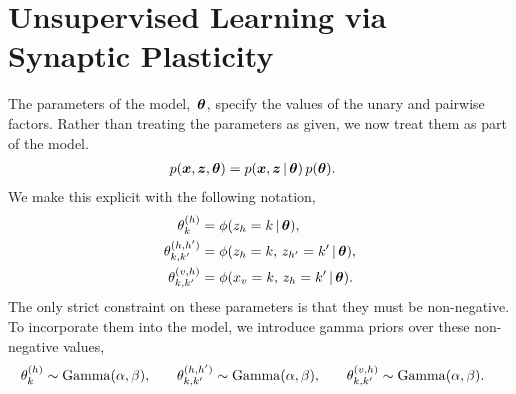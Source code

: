 \begin{comment}
To start, assume~$\gamma=1$,~$\bo=\bone$,
and~${\bG = \bone\bone^\trans}$ (fully connected) so that
${\blambda_{\textsf{ss}} = b \left( \bI - \bA \right)^{-1} \bone}$.
Under these conditions, the model is receiving uninformative
observations, so we expect the posterior probability to be determined
solely by the location dynamics model. How do we reconcile this 
steady state solution with our intuition from Markov chain 
theory that the steady state should converge to the principal 
eigenvector of the transition matrix? If~$\bA$ is a row 
stochastic transition matrix (all rows sum to one), 
then by the Perron-Frobenius theorem the maximum eigenvalue is 
exactly one. Thus,~$\bI - \bA$ will be singular, and its inverse 
will diverge to infinity. However, in Markov chains,~$b=0$, 
so this divergence is canceled out and the limit is 
the principal eigenvector of~$\bA$.

Can we design a system with~$b>0$ and~$\rho(\bA)<1$ that closely 
approximates this steady state distribution? 
\end{comment}

\section{Unsupervised Learning via Synaptic Plasticity}
\label{sec:learning}
The parameters of the model,~$\boldsymbol{\theta}$, specify the values of the 
unary and pairwise factors. Rather than
treating the parameters as given, we now treat them as part of the
model.
\begin{align}
  p(\boldsymbol{x}, \boldsymbol{z}, \boldsymbol{\theta}) &= p(\boldsymbol{x}, \boldsymbol{z} \,|\, \boldsymbol{\theta}) \, p(\boldsymbol{\theta}).
\end{align}
We make this explicit with the following notation,
\begin{align}
  \theta_{k}^{(h)} &= \phi(z_h=k \,|\, \boldsymbol{\theta}), \\
  \theta_{k, k'}^{(h,h')} &= \phi(z_h=k, \, z_{h'}=k'\,|\, \boldsymbol{\theta}), \\
  \theta_{k, k'}^{(v,h)}  &= \phi(x_v=k, \, z_h=k' \,|\, \boldsymbol{\theta}).
\end{align}
The only strict constraint on these parameters is that they 
must be non-negative. 
To incorporate them into the model, we introduce gamma priors
over these non-negative values,
\begin{align}
  \theta_{k}^{(h)} &\sim \mathrm{Gamma}(\alpha, \beta), & & &
  \theta_{k,k'}^{(h,h')} &\sim \mathrm{Gamma}(\alpha, \beta), & & &
  \theta_{k,k'}^{(v,h)} &\sim \mathrm{Gamma}(\alpha, \beta).
\end{align}

